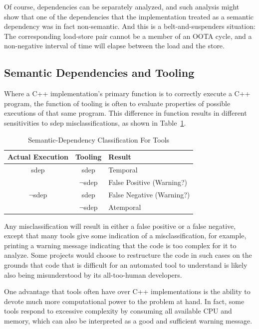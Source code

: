 \documentclass[10]{article}
\begin{document}
Of course, dependencies can be separately analyzed, and such analysis
might show that one of the dependencies that the implementation treated
as a semantic dependency was in fact non-semantic.
And this is a belt-and-suspenders situation:
The corresponding load-store pair cannot be a member of an OOTA cycle,
and a non-negative interval of time will elapse between the load and
the store.

\subsection{Semantic Dependencies and Tooling}
\label{sec:Semantic Dependencies and Tooling}

Where a C++ implementation's primary function is to correctly execute
a C++ program, the function of tooling is often to evaluate properties
of possible executions of that same program.
This difference in function results in different sensitivities to
sdep misclassifications, as shown in
Table~\ref{tab:Semantic-Dependency Classification For Tools}.

\begin{table}
\centering
\begin{tabular}{c|c|l}
Actual Execution	& Tooling		& Result \\
\hline
sdep			& sdep			& Temporal \\
\cline{2-3}
			& $\neg$sdep		& False Positive (Warning?) \\
\hline
$\neg$sdep		& sdep			& False Negative (Warning?) \\
\cline{2-3}
			& $\neg$sdep		& Atemporal \\
\end{tabular}
\caption{Semantic-Dependency Classification For Tools}
\label{tab:Semantic-Dependency Classification For Tools}
\end{table}

Any misclassification will result in either a false positive or
a false negative, except that many tools give some indication of a
misclassification, for example, printing a warning message indicating
that the code is too complex for it to analyze.
Some projects would choose to restructure the code in such cases on the
grounds that code that is difficult for an automated tool to understand
is likely also being misunderstood by its all-too-human developers.

One advantage that tools often have over C++ implementations is the
ability to devote much more computational power to the problem at hand.
In fact, some tools respond to excessive complexity by consuming all
available CPU and memory, which can also be interpreted as a good and
sufficient warning message.
\end{document}
